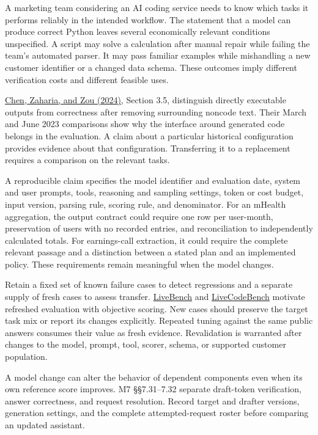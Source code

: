 \noindent \noindent A marketing team considering an AI coding service needs to
know which tasks it performs reliably in the intended workflow. The
statement that a model can produce correct Python leaves several
economically relevant conditions unspecified. A script may solve a
calculation after manual repair while failing the team's automated
parser. It may pass familiar examples while mishandling a new customer
identifier or a changed data schema. These outcomes imply different
verification costs and different feasible uses.

\href{https://hdsr.mitpress.mit.edu/pub/y95zitmz/release/2}{Chen,
Zaharia, and Zou (2024)}, Section 3.5, distinguish directly executable
outputs from correctness after removing surrounding noncode text. Their
March and June 2023 comparisons show why the interface around generated
code belongs in the evaluation. A claim about a particular historical
configuration provides evidence about that configuration. Transferring
it to a replacement requires a comparison on the relevant tasks.

A reproducible claim specifies the model identifier and evaluation date,
system and user prompts, tools, reasoning and sampling settings, token
or cost budget, input version, parsing rule, scoring rule, and
denominator. For an mHealth aggregation, the output contract could
require one row per user-month, preservation of users with no recorded
entries, and reconciliation to independently calculated totals. For
earnings-call extraction, it could require the complete relevant passage
and a distinction between a stated plan and an implemented policy. These
requirements remain meaningful when the model changes.

Retain a fixed set of known failure cases to detect regressions and a
separate supply of fresh cases to assess transfer.
\href{https://arxiv.org/abs/2406.19314v2}{LiveBench} and
\href{https://arxiv.org/abs/2403.07974v2}{LiveCodeBench} motivate
refreshed evaluation with objective scoring. New cases should preserve
the target task mix or report its changes explicitly. Repeated tuning
against the same public answers consumes their value as fresh evidence.
Revalidation is warranted after changes to the model, prompt, tool,
scorer, schema, or supported customer population.

\noindent A model change can alter the behavior of dependent components
even when its own reference score improves. M7 §§7.31--7.32 separate
draft-token verification, answer correctness, and request resolution.
Record target and drafter versions, generation settings, and the
complete attempted-request roster before comparing an updated assistant.

